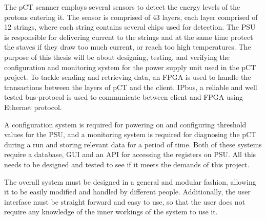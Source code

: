 \documentclass[main.tex]{subfiles}
\begin{document}

The pCT scanner employs several sensors to detect the energy levels of the protons entering it. The sensor is comprised of 43 layers, each layer comprised of 12 strings, where each string contains several chips used for detection. The PSU is responsible for delivering current to the strings and at the same time protect the staves if they draw too much current, or reach too high temperatures. The purpose of this thesis will be about designing, testing, and verifying the configuration and monitoring system for the power supply unit used in the pCT project. To tackle sending and retrieving data, an FPGA is used to handle the transactions between the layers of pCT and the client. IPbus, a reliable and well tested bus-protocol is used to communicate between client and FPGA using Ethernet protocol.

A configuration system is required for powering on and configuring threshold values for the PSU, and a monitoring system is required for diagnosing the pCT during a run and storing relevant data for a period of time. Both of these systems require a database, GUI and an API for accessing the registers on PSU. All this needs to be designed and tested to see if it meets the demands of this project.

The overall system must be designed in a general and modular fashion, allowing it to be easily modified and handled by different people. Additionally, the user interface must be straight forward and easy to use, so that the user does not require any knowledge of the inner workings of the system to use it.
\end{document}
